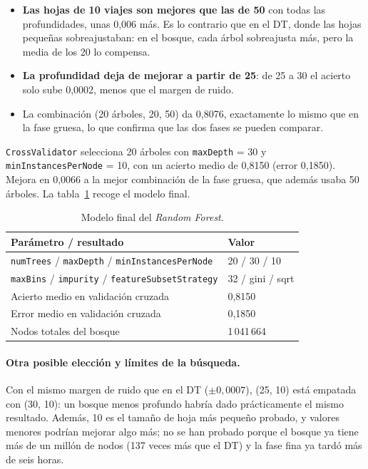 \documentclass[12pt,a4paper]{article}
\begin{document}
\begin{itemize}
    \item \textbf{Las hojas de 10 viajes son mejores que las de 50} con
    todas las profundidades, unas 0,006 más. Es lo contrario que en el
    \ac{DT}, donde las hojas pequeñas sobreajustaban: en el bosque, cada
    árbol sobreajusta más, pero la media de los 20 lo compensa.
    \item \textbf{La profundidad deja de mejorar a partir de 25}: de 25 a
    30 el acierto solo sube 0,0002, menos que el margen de ruido.
    \item La combinación (20 árboles, 20, 50) da 0,8076, exactamente lo
    mismo que en la fase gruesa, lo que confirma que las dos fases se pueden
    comparar.
\end{itemize}

\texttt{CrossValidator} selecciona 20 árboles con \texttt{maxDepth} = 30 y
\texttt{minInstancesPerNode} = 10, con un acierto medio de 0,8150 (error
0,1850). Mejora en 0,0066 a la mejor combinación de la fase gruesa, que
además usaba 50 árboles. La tabla~\ref{tab:rf-final} recoge el modelo
final.

\begin{table}[H]
\centering
\small
\begin{tabular}{ll}
\toprule
\textbf{Parámetro / resultado} & \textbf{Valor} \\
\midrule
\texttt{numTrees} / \texttt{maxDepth} / \texttt{minInstancesPerNode} & 20 / 30 / 10 \\
\texttt{maxBins} / \texttt{impurity} / \texttt{featureSubsetStrategy} & 32 / gini / sqrt \\
Acierto medio en validación cruzada & 0,8150 \\
Error medio en validación cruzada & 0,1850 \\
Nodos totales del bosque & 1\,041\,664 \\
\bottomrule
\end{tabular}
\caption{Modelo final del \textit{Random Forest}.}
\label{tab:rf-final}
\end{table}

\paragraph{Otra posible elección y límites de la búsqueda.} Con el mismo
margen de ruido que en el \ac{DT} ($\pm 0{,}0007$), (25, 10) está empatada
con (30, 10): un bosque menos profundo habría dado prácticamente el mismo
resultado. Además, 10 es el tamaño de hoja más pequeño probado, y valores
menores podrían mejorar algo más; no se han probado porque el bosque ya
tiene más de un millón de nodos (137 veces más que el \ac{DT}) y la fase
fina ya tardó más de seis horas.
\end{document}
